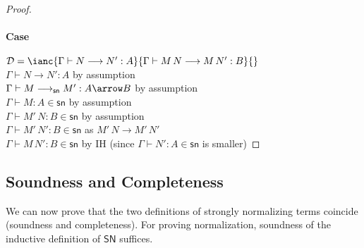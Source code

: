 \documentclass{article}
\newcommand{\SN}{\mathsf{SN}}
\newcommand{\csn}{\mathsf{sn}}
\newcommand{\red}{\longrightarrow}
\newcommand{\redsn}{\longrightarrow_\csn}
\begin{document}
\begin{proof}
\paragraph{Case} $\mathcal{D} = \ianc{\Gamma \vdash N \red N' : A}{\Gamma \vdash M\,N \red M\,N': B}{}$
\\[1em]
$\Gamma \vdash N \red N' : A $ \hfill by assumption \\
$\Gamma \vdash M \redsn M' : A \arrow B$ \hfill by assumption \\
$\Gamma \vdash M: A \in \csn$ \hfill  by assumption\\
$\Gamma \vdash M'\,N : B \in \csn$ \hfill by assumption\\
$\Gamma \vdash M'\,N': B \in \csn$ \hfill as $M'\,N \red M'\,N'$\\
$\Gamma \vdash M\,N' : B \in \csn$ \hfill by IH (since $\Gamma \vdash N': A \in \csn$ is smaller)

\end{proof}

\subsection{Soundness and Completeness}
We can now prove that the two definitions of strongly normalizing terms coincide (soundness and completeness).
For proving normalization, soundness of the inductive definition of $\SN$ suffices.
\end{document}
